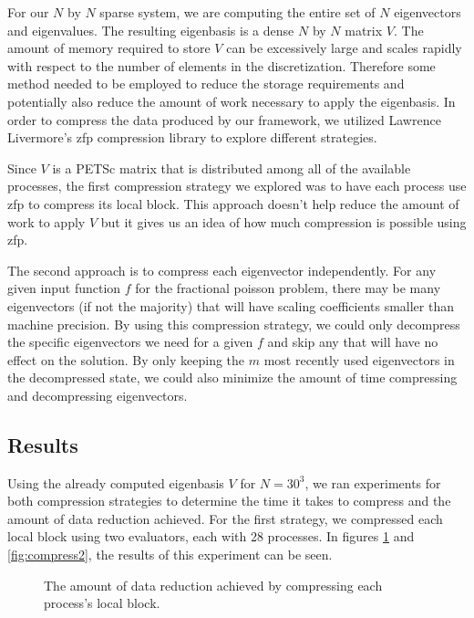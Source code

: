 For our $N$ by $N$ sparse system, we are computing the entire set of $N$ eigenvectors and eigenvalues. The resulting eigenbasis is a dense $N$ by $N$ matrix $V$. The amount of memory required to store $V$ can be excessively large and scales rapidly with respect to the number of elements in the discretization. Therefore some method needed to be employed to reduce the storage requirements and potentially also reduce the amount of work necessary to apply the eigenbasis. In order to compress the data produced by our framework, we utilized Lawrence Livermore's zfp compression library \cite{zfp} to explore different strategies.

Since $V$ is a PETSc matrix that is distributed among all of the available processes, the first compression strategy we explored was to have each process use zfp to compress its local block. This approach doesn't help reduce the amount of work to apply $V$ but it gives us an idea of how much compression is possible using zfp.

The second approach is to compress each eigenvector independently. For any given input function $f$ for the fractional poisson problem, there may be many eigenvectors (if not the majority) that will have scaling coefficients smaller than machine precision. By using this compression strategy, we could only decompress the specific eigenvectors we need for a given $f$ and skip any that will have no effect on the solution. By only keeping the $m$ most recently used eigenvectors in the decompressed state, we could also minimize the amount of time compressing and decompressing eigenvectors.

\subsection{Results}

Using the already computed eigenbasis $V$ for $N = 30^3$, we ran experiments for both compression strategies to determine the time it takes to compress and the amount of data reduction achieved. For the first strategy, we compressed each local block using two evaluators, each with 28 processes. In figures \ref{fig:reduce2} and \ref{fig:compress2}, the results of this experiment can be seen.

\begin{figure}
	\caption{The amount of data reduction achieved by compressing each process's local block.}
	\label{fig:reduce2}
	
\end{figure}

